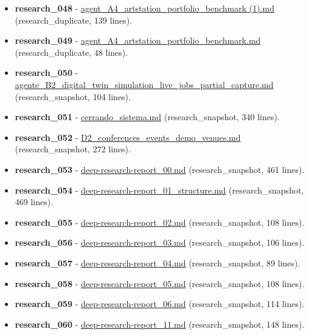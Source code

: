 \begin{itemize}
\item \textbf{research\_048} - \href{file:///E:/Laboral/Research/agent_A4_artstation_portfolio_benchmark\%20\%281\%29.md}{agent\_A4\_artstation\_portfolio\_benchmark (1).md} (research\_duplicate, 139 lines).
\item \textbf{research\_049} - \href{file:///E:/Laboral/Research/agent_A4_artstation_portfolio_benchmark.md}{agent\_A4\_artstation\_portfolio\_benchmark.md} (research\_duplicate, 48 lines).
\item \textbf{research\_050} - \href{file:///E:/Laboral/Research/agente_B2_digital_twin_simulation_live_jobs_partial_capture.md}{agente\_B2\_digital\_twin\_simulation\_live\_jobs\_partial\_capture.md} (research\_snapshot, 104 lines).
\item \textbf{research\_051} - \href{file:///E:/Laboral/Research/cerrando_sistema.md}{cerrando\_sistema.md} (research\_snapshot, 340 lines).
\item \textbf{research\_052} - \href{file:///E:/Laboral/Research/D2_conferences_events_demo_venues.md}{D2\_conferences\_events\_demo\_venues.md} (research\_snapshot, 272 lines).
\item \textbf{research\_053} - \href{file:///E:/Laboral/Research/deep-research-report_00.md}{deep-research-report\_00.md} (research\_snapshot, 461 lines).
\item \textbf{research\_054} - \href{file:///E:/Laboral/Research/deep-research-report_01_structure.md}{deep-research-report\_01\_structure.md} (research\_snapshot, 469 lines).
\item \textbf{research\_055} - \href{file:///E:/Laboral/Research/deep-research-report_02.md}{deep-research-report\_02.md} (research\_snapshot, 108 lines).
\item \textbf{research\_056} - \href{file:///E:/Laboral/Research/deep-research-report_03.md}{deep-research-report\_03.md} (research\_snapshot, 106 lines).
\item \textbf{research\_057} - \href{file:///E:/Laboral/Research/deep-research-report_04.md}{deep-research-report\_04.md} (research\_snapshot, 89 lines).
\item \textbf{research\_058} - \href{file:///E:/Laboral/Research/deep-research-report_05.md}{deep-research-report\_05.md} (research\_snapshot, 108 lines).
\item \textbf{research\_059} - \href{file:///E:/Laboral/Research/deep-research-report_06.md}{deep-research-report\_06.md} (research\_snapshot, 114 lines).
\item \textbf{research\_060} - \href{file:///E:/Laboral/Research/deep-research-report_11.md}{deep-research-report\_11.md} (research\_snapshot, 148 lines).

\end{itemize}

